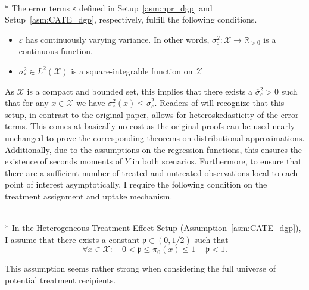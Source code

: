 \begin{boxD}
	\begin{asm}\label{asm:errors}\mbox{}\\*
		The error terms $\varepsilon$ defined in Setup~\ref{asm:npr_dgp} and Setup~\ref{asm:CATE_dgp}, respectively, fulfill the following conditions.
        \begin{itemize}
            \item $\varepsilon$ has continuously varying variance.
		      In other words, $\sigma^2_{\varepsilon}: \mathcal{X} \rightarrow \mathbb{R}_{>0}$ is a continuous function.
            \item $\sigma^2_{\varepsilon} \in L^{2}\left(\mathcal{X}\right)$ is a square-integrable function on $\mathcal{X}$
        \end{itemize}
	\end{asm}
\end{boxD}
As $\mathcal{X}$ is a compact and bounded set, this implies that there exists a $\overline{\sigma}_{\varepsilon}^2 > 0$ such that for any $x \in \mathcal{X}$ we have $\sigma^{2}_{\varepsilon}\left(x\right) \leq \overline{\sigma}_{\varepsilon}^2$.
Readers of \citet{demirkaya_optimal_2024} will recognize that this setup, in contrast to the original paper, allows for heteroskedasticity of the error terms.
This comes at basically no cost as the original proofs can be used nearly unchanged to prove the corresponding theorems on distributional approximations.
Additionally, due to the assumptions on the regression functions, this ensures the existence of seconds moments of $Y$ in both scenarios.
Furthermore, to ensure that there are a sufficient number of treated and untreated observations local to each point of interest asymptotically, I require the following condition on the treatment assignment and uptake mechanism.
\begin{boxD}
	\begin{asm}\label{asm:treatment_overlap}\mbox{}\\*
		In the Heterogeneous Treatment Effect Setup (Assumption~\ref{asm:CATE_dgp}), I assume that there exists a constant $\mathfrak{p} \in (0, 1/2)$ such that
		\begin{equation}
			\forall x \in \mathcal{X}: \quad 
			0 < \mathfrak{p} \leq \pi_{0}\left(x\right) \leq 1 - \mathfrak{p} < 1.
		\end{equation}
	\end{asm}
\end{boxD}
This assumption seems rather strong when considering the full universe of potential treatment recipients.

